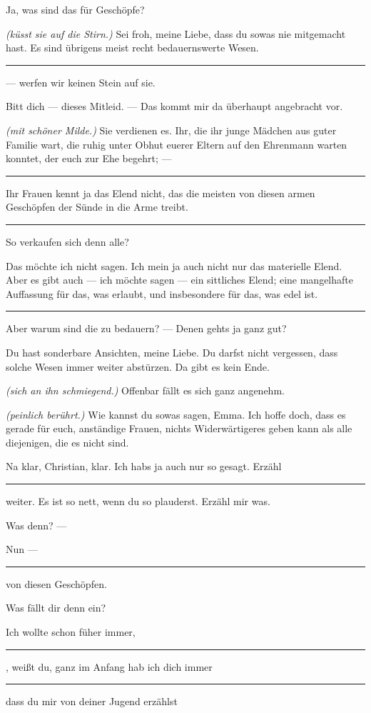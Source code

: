 \documentclass[
	final,
	a4paper,
	ngerman,
	mpinclude = true, %
	twoside = true,
	open = right,
	cleardoublepage = plain,
	DIV = 13,
	BCOR = 1cm,
	titlepage = firstiscover,
	]{scrbook}
\newcommand{\direction}[1]{\textit{(#1)}}
\newenvironment{deletion}{%
		\vspace{0.25\baselineskip}
		\hrule
		\vspace{0.25\baselineskip}
		\color{darkgray}
	}{
		\color{black}
		\vspace{0.25\baselineskip}
		\hrule 
		\vspace{0.25\baselineskip}
	}
\newcommand{\thecharacter}[1]{\textup{\textsc{#1}}\xspace}
\newcommand{\thefrau}{\thecharacter{Emma}}
\newcommand{\thegatte}{\thecharacter{Christian}}
\newcommand{\character}[1]{\item[#1:]}
\newcommand{\frau}{\character{\thefrau}}
\newcommand{\gatte}{\character{\thegatte}}
\begin{document}
\begin{play}
	\frau
	Ja, was sind das für Geschöpfe?

	\gatte
	\direction{küsst sie auf die Stirn.} Sei froh, meine Liebe, dass du sowas nie mitgemacht hast. Es sind übrigens meist recht bedauernswerte Wesen.
	\begin{deletion}
	--- werfen wir keinen Stein auf sie.

	\frau
	Bitt dich --- dieses Mitleid. --- Das kommt mir da überhaupt angebracht vor.

	\gatte
	\direction{mit schöner Milde.} Sie verdienen es. Ihr, die ihr junge Mädchen aus guter Familie wart, die ruhig unter Obhut euerer Eltern auf den Ehrenmann warten konntet, der euch zur Ehe begehrt; ---
	\end{deletion}
	Ihr Frauen kennt ja das Elend nicht, das die meisten von diesen armen Geschöpfen der Sünde in die Arme treibt.

	\begin{deletion}
	\frau
	So verkaufen sich denn alle?

	\gatte
	Das möchte ich nicht sagen. Ich mein ja auch nicht nur das materielle Elend. Aber es gibt auch --- ich möchte sagen --- ein sittliches Elend; eine mangelhafte Auffassung für das, was erlaubt, und insbesondere für das, was edel ist.
	\end{deletion}

	\frau
	Aber warum sind die zu bedauern? --- Denen gehts ja ganz gut?

	\gatte
	Du hast sonderbare Ansichten, meine Liebe. Du darfst nicht vergessen, dass solche Wesen immer weiter abstürzen. Da gibt es kein Ende.

	\frau
	\direction{sich an ihn schmiegend.} Offenbar fällt es sich ganz angenehm.

	\gatte
	\direction{peinlich berührt.} Wie kannst du sowas sagen, Emma. Ich hoffe doch, dass es gerade für euch, anständige Frauen, nichts Widerwärtigeres geben kann als alle diejenigen, die es nicht sind.

	\frau
	Na klar, Christian, klar. Ich habs ja auch nur so gesagt. Erzähl
	\begin{deletion}
	weiter. Es ist so nett, wenn du so plauderst. Erzähl mir was.

	\gatte
	Was denn? ---

	\frau
	Nun ---
	\end{deletion}
	von diesen Geschöpfen.

	\gatte
	Was fällt dir denn ein?

	\frau
	Ich wollte schon füher immer,
	\begin{deletion}
		, weißt du, ganz im Anfang hab ich dich immer
	\end{deletion}
	dass du mir von deiner Jugend erzählst


\end{play}
\end{document}
